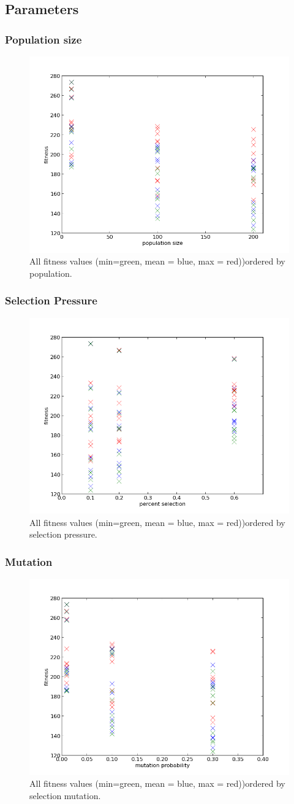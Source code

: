 \documentclass{scrartcl}
\begin{document}
\subsection{Parameters}
\subsubsection{Population size}

\begin{figure}
 \center
 \includegraphics[width=.5\linewidth]{img/ex3/tsp_fitness_population.png}
 \caption{All fitness values (min=green, mean = blue, max = red))ordered by population.}
\end{figure}

\subsubsection{Selection Pressure} 

\begin{figure}
 \center
 \includegraphics[width=.5\linewidth]{img/ex3/tsp_fitness_selection.png}
 \caption{All fitness values (min=green, mean = blue, max = red))ordered by selection pressure.}
\end{figure}


\subsubsection{Mutation}
\begin{figure}
 \center
 \includegraphics[width=.5\linewidth]{img/ex3/tsp_fitness_mutation.png}
 \caption{All fitness values (min=green, mean = blue, max = red))ordered by selection mutation.}
\end{figure}
\end{document}
